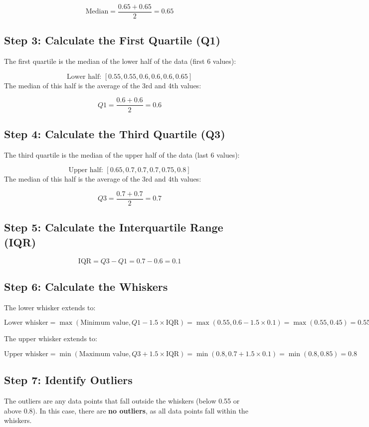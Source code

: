 \documentclass{article}
\begin{document}
	\[
	\text{Median} = \frac{0.65 + 0.65}{2} = 0.65
	\]
	
	\subsection*{Step 3: Calculate the First Quartile (Q1)}
	The first quartile is the median of the lower half of the data (first 6 values):
	
	\[
	\text{Lower half: } [0.55, 0.55, 0.6, 0.6, 0.6, 0.65]
	\]
	The median of this half is the average of the 3rd and 4th values:
	
	\[
	Q1 = \frac{0.6 + 0.6}{2} = 0.6
	\]
	
	\subsection*{Step 4: Calculate the Third Quartile (Q3)}
	The third quartile is the median of the upper half of the data (last 6 values):
	
	\[
	\text{Upper half: } [0.65, 0.7, 0.7, 0.7, 0.75, 0.8]
	\]
	The median of this half is the average of the 3rd and 4th values:
	
	\[
	Q3 = \frac{0.7 + 0.7}{2} = 0.7
	\]
	
	\subsection*{Step 5: Calculate the Interquartile Range (IQR)}
	\[
	\text{IQR} = Q3 - Q1 = 0.7 - 0.6 = 0.1
	\]
	
	\subsection*{Step 6: Calculate the Whiskers}
	The lower whisker extends to:
	
	\[
	\text{Lower whisker} = \max(\text{Minimum value}, Q1 - 1.5 \times \text{IQR}) = \max(0.55, 0.6 - 1.5 \times 0.1) = \max(0.55, 0.45) = 0.55
	\]
	
	The upper whisker extends to:
	
	\[
	\text{Upper whisker} = \min(\text{Maximum value}, Q3 + 1.5 \times \text{IQR}) = \min(0.8, 0.7 + 1.5 \times 0.1) = \min(0.8, 0.85) = 0.8
	\]
	
	\subsection*{Step 7: Identify Outliers}
	The outliers are any data points that fall outside the whiskers (below 0.55 or above 0.8). In this case, there are \textbf{no outliers}, as all data points fall within the whiskers.
	
\end{document}
